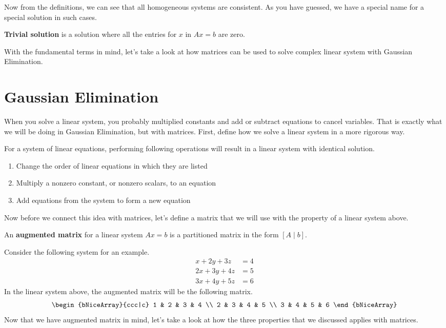 \documentclass[../main.tex]{subfiles}
\begin{document}
Now from the definitions, we can see that all homogeneous systems
are consistent. As you have guessed, we have a special name for
a special solution in such cases.

\begin{definition}
\textbf{Trivial solution} is a solution where all the entries for
$x$ in $Ax = b$ are zero.
\end{definition}

With the fundamental terms in mind, let's take a look at how matrices
can be used to solve complex linear system with Gaussian Elimination.

\section{Gaussian Elimination}

When you solve a linear system, you probably multiplied constants
and add or subtract equations to cancel variables. That is exactly
what we will be doing in Gaussian Elimination, but with matrices.
First, define how we solve a linear system in a more rigorous way.

\begin{definition}
For a system of linear equations, performing following operations
will result in a linear system with identical solution.
\begin{enumerate}[noitemsep]
\item
Change the order of linear equations in which they are listed
\item
Multiply a nonzero constant, or nonzero scalars, to an equation
\item
Add equations from the system to form a new equation
\end{enumerate}
\end{definition}

Now before we connect this idea with matrices, let's define a matrix
that we will use with the property of a linear system above.

\begin{definition}
An \textbf{augmented matrix} for a linear system $Ax = b$ is a
partitioned matrix in the form $[A \mid b]$.
\end{definition}

Consider the following system for an example.
\begin{align*}
    x + 2y + 3z &= 4 \\
    2x + 3y + 4z &= 5 \\
    3x + 4y + 5z &= 6
\end{align*}
In the linear system above, the augmented matrix will be the following
matrix.
\[
\begin{bNiceArray}{ccc|c}
    1 & 2 & 3 & 4 \\
    2 & 3 & 4 & 5 \\
    3 & 4 & 5 & 6
\end{bNiceArray}
\]
Now that we have augmented matrix in mind, let's take a look at
how the three properties that we discussed applies with matrices.
\end{document}
